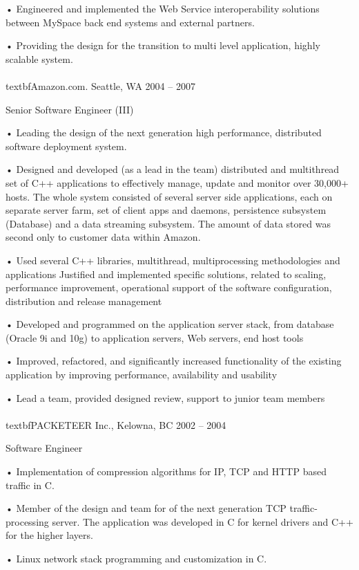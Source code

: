     • Engineered and implemented the Web Service interoperability solutions between MySpace back end systems and external partners.

    • Providing the design for the transition to multi level application, highly scalable system.
\\~\\
textbf{Amazon.com. Seattle, WA								2004 – 2007}

Senior Software Engineer (III)								

    • Leading the design of the next generation high performance, distributed software deployment system. 

    • Designed and developed (as a lead in the team) distributed and multithread set of C++ applications to effectively manage, update and monitor over 30,000+ hosts.  The whole system consisted of several server side applications, each on separate server farm, set of client apps and daemons, persistence subsystem (Database) and a data streaming subsystem.  The amount of data stored was second only to customer data within Amazon.

    • Used several C++ libraries,  multithread, multiprocessing methodologies and applications Justified and implemented specific solutions, related to scaling, performance improvement, operational support of the software configuration, distribution and release management

    • Developed and programmed on the application server stack, from database (Oracle 9i and 10g) to application servers, Web servers, end host tools

    • Improved, refactored, and significantly increased functionality of the existing application by improving performance, availability and usability

    • Lead a team, provided designed review, support to junior team members
\\~\\
textbf{PACKETEER Inc., Kelowna, BC							2002 – 2004}

Software Engineer											

    • Implementation of compression algorithms for IP, TCP and HTTP based traffic in C.

    • Member of the design and team for of the next generation TCP traffic-processing server. The application was developed in C for kernel drivers and C++ for the higher layers.

    • Linux network stack programming and customization in C.

